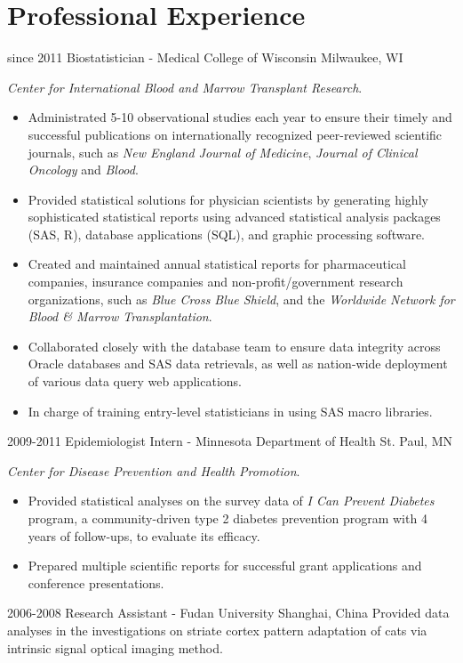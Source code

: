 \section{Professional Experience}

\begin{entrylist}
  \entry
    {since 2011}
    {Biostatistician - Medical College of Wisconsin}
    {Milwaukee, WI}
    {
    \textit{Center for International Blood and Marrow Transplant Research}.
    \begin{itemize}
      \item Administrated 5-10 observational studies each year to ensure their timely and successful publications on internationally recognized peer-reviewed scientific journals, such as \textit{New England Journal of Medicine}, \textit{Journal of Clinical Oncology} and \textit{Blood}.
      \item Provided statistical solutions for physician scientists by generating highly sophisticated statistical reports using advanced statistical analysis packages (SAS, R), database applications (SQL), and graphic processing software.
      \item Created and maintained annual statistical reports for pharmaceutical companies, insurance companies and non-profit/government research organizations, such as \textit{Blue Cross Blue Shield}, and the \textit{Worldwide Network for Blood \& Marrow Transplantation}.
      \item Collaborated closely with the database team to ensure data integrity across Oracle databases and SAS data retrievals, as well as nation-wide deployment of various data query web applications.
      \item In charge of training entry-level statisticians in using SAS macro libraries.
    \end{itemize}
    }
  \entry
    {2009-2011}
    {Epidemiologist Intern - Minnesota Department of Health}
    {St. Paul, MN}
    {
    \textit{Center for Disease Prevention and Health Promotion}.
    \begin{itemize}
      \item Provided statistical analyses on the survey data of \textit{I Can Prevent Diabetes} program, a community-driven type 2 diabetes prevention program with 4 years of follow-ups, to evaluate its efficacy.
      \item Prepared multiple scientific reports for successful grant applications and conference presentations.
    \end{itemize}
    }
  \entry
    {2006-2008}
    {Research Assistant - Fudan University}
    {Shanghai, China}
    {Provided data analyses in the investigations on striate cortex pattern adaptation of cats via intrinsic signal optical imaging method.}
\end{entrylist}

